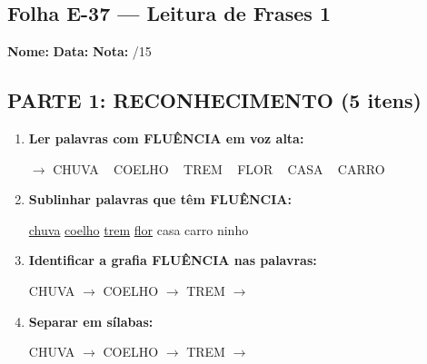 \subsection{Folha E-37 --- Leitura de Frases 1}
\begin{exercicio}



\noindent\textbf{Nome:} \underline{\hspace{3.2cm}} \quad \textbf{Data:} \underline{\hspace{1.6cm}} \quad \textbf{Nota:} \underline{\hspace{0.9cm}}/15


\subsection*{PARTE 1: RECONHECIMENTO (5 itens)}

\begin{enumerate}

  \item \textbf{Ler palavras com FLUÊNCIA em voz alta:}
  \begin{center}
  $\rightarrow$ CHUVA ~ COELHO ~ TREM ~ FLOR ~ CASA ~ CARRO
  \end{center}

  \item \textbf{Sublinhar palavras que têm FLUÊNCIA:}

\begin{center}
  \uline{chuva} \quad \uline{coelho} \quad \uline{trem} \quad \uline{flor} \quad casa \quad carro \quad ninho
\end{center}

  \item \textbf{Identificar a grafia FLUÊNCIA nas palavras:}
  \begin{center}
  CHUVA $\rightarrow$ \underline{\hspace{1cm}} \quad COELHO $\rightarrow$ \underline{\hspace{1cm}} \quad TREM $\rightarrow$ \underline{\hspace{1cm}}
  \end{center}

  \item \textbf{Separar em sílabas:}
  \begin{center}
  CHUVA $\rightarrow$ \underline{\hspace{1.2cm}} \quad COELHO $\rightarrow$ \underline{\hspace{1.2cm}} \quad TREM $\rightarrow$ \underline{\hspace{1.2cm}}
  \end{center}


\end{enumerate}
\end{exercicio}
